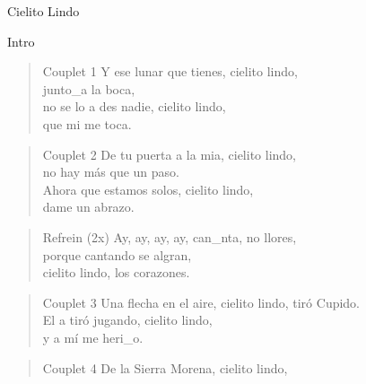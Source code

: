 \begin{song}[copla]{Cielito Lindo}
\begin{instrumental}{Intro}
\measure{}\measure{}\measure{}\measure{}\measure{}\measure{}
\measure{}\measure{}\measure{}\measure{}\measure{}\measure{}\measure{}
\measure{}\measure*{}
\end{instrumental}
\begin{verse}{Couplet 1}
Y ese lunar que tienes, cielito lindo,\\
junto\_a la boca,\hspace{5em}\\
\chord{}no se lo a des nadie, cielito lindo,\\
que mi me toca.\\
\end{verse}
\begin{verse}{Couplet 2}
De tu puerta a la mia, cielito lindo,\\
no hay más que un paso.\\
\chord{}Ahora que estamos solos, cielito lindo,\\
dame un abrazo.\\
\end{verse}
\begin{verse}{Refrein (2x)}
Ay, ay, ay, ay,\hspace{1em}\hspace{1em} can\_nta, no llores,\\
porque cantando se algran,\\
cielito lindo, los corazones.\\
\end{verse}
\begin{verse}{Couplet 3}
Una flecha en el aire, cielito lindo,
tiró Cupido.\\
\chord{}El a tiró jugando, cielito lindo,\\
y a mí me heri\_o.\\
\end{verse}
\begin{verse}{Couplet 4}
De la Sierra Morena, cielito lindo,\\

\end{verse}
\end{song}
